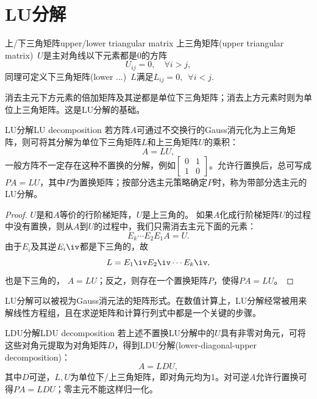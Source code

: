 \section{LU分解}

\begin{definition}{上/下三角矩阵}{upper/lower triangular matrix}
	上三角矩阵(upper triangular matrix)~$U$是主对角线以下元素都是0的方阵
	\[
		U_{ij}=0,\quad\forall i>j,
	\]
	同理可定义下三角矩阵(lower ...)~$L$满足$L_{ij}=0,\enspace\forall i<j.$
\end{definition}
消去主元下方元素的倍加矩阵及其逆都是单位下三角矩阵；消去上方元素时则为单位上三角矩阵。这是LU分解的基础。
\begin{theorem}{LU分解}{LU decomposition}
	若方阵$A$可通过不交换行的Gauss消元化为上三角矩阵，则可将其分解为单位下三角矩阵$L$和上三角矩阵$U$的乘积：
	\begin{equation}
		A=LU,
	\end{equation}
	一般方阵不一定存在这种不置换的分解，例如$\begin{bmatrix}0&1\\1&0\end{bmatrix}$。允许行置换后，总可写成$PA=LU$，其中$P$为置换矩阵；按部分选主元策略确定$P$时，称为带部分选主元的LU分解。
\end{theorem}
\begin{proof}
	$U$是和$A$等价的行阶梯矩阵，$U$是上三角的。
	如果$A$化成行阶梯矩阵$U$的过程中没有置换，则从$A$到$U$的过程中，我们只需消去主元下面的元素：
	\[
		E_k\cdots E_2E_1A=U.
	\]
	由于$E_i$及其逆$E_i\iv$都是下三角的，故
	\[
		L=E_1\iv E_2\iv\cdots E_k\iv,
	\]
	也是下三角的，%
	$A=LU$；反之，则存在一个置换矩阵$P$，使得$PA=LU$。
\end{proof}

\begin{remark}
	LU分解可以被视为Gauss消元法的矩阵形式。在数值计算上，LU分解经常被用来解线性方程组，且在求逆矩阵和计算行列式中都是一个关键的步骤。
\end{remark}

\begin{theorem}
	{LDU分解}{LDU decomposition}
	若上述不置换LU分解中的$U$具有非零对角元，可将这些对角元提取为对角矩阵$D$，得到LDU分解(lower-diagonal-upper decomposition)：
	\[
		A=LDU,
	\]
	其中$D$可逆，$L,U$为单位下/上三角矩阵，即对角元均为1。对可逆$A$允许行置换可得$PA=LDU$；零主元不能这样归一化。
\end{theorem}

